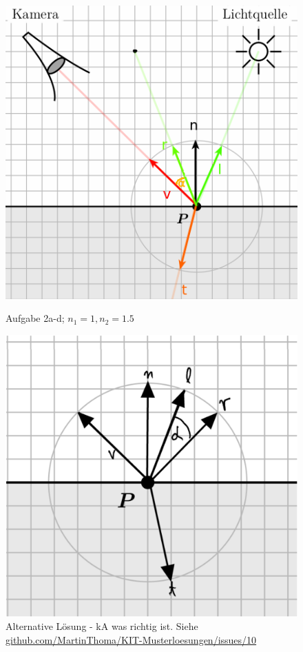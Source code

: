 \documentclass[a4paper]{scrartcl}
\begin{document}
\begin{figure}[h]
    \begin{minipage}[b]{0.45\linewidth}
        \centering
        \includegraphics*[width=\textwidth, keepaspectratio]{2a.png}
        \caption{Aufgabe 2a-d; $n_1 = 1, n_2 = 1.5$}
        \label{fig:2a}
    \end{minipage}
    \hspace{0.5cm}
    \begin{minipage}[b]{0.45\linewidth}
        \centering
        \includegraphics[width=\textwidth, keepaspectratio]{2-alternative.png}
        \caption{Alternative Lösung - kA was richtig ist. Siehe \href{https://github.com/MartinThoma/KIT-Musterloesungen/issues/10}{github.com/MartinThoma/KIT-Musterloesungen/issues/10}}
        \label{fig:2a-alternative}
    \end{minipage}
    \centering
\end{figure}
\end{document}
